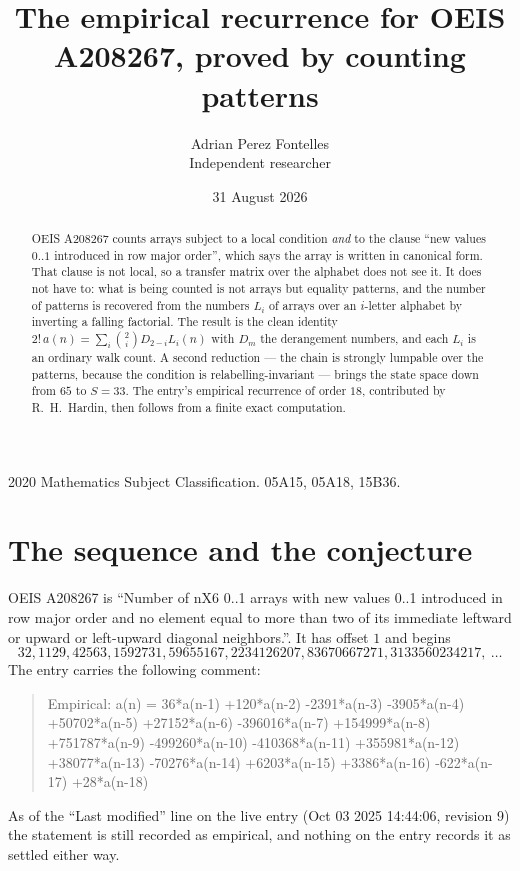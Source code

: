\documentclass[11pt,a4paper]{article}
\title{The empirical recurrence for OEIS A208267, proved by counting patterns}
\author{Adrian Perez Fontelles\\ \small Independent researcher}
\date{31 August 2026}
\theoremstyle{plain}
\theoremstyle{definition}
\begin{document}
\maketitle

\begin{abstract}
OEIS A208267 counts arrays subject to a local condition \emph{and} to the clause ``new values
$0..1$ introduced in row major order'', which says the array is written in canonical
form. That clause is not local, so a transfer matrix over the alphabet does not see it. It
does not have to: what is being counted is not arrays but equality patterns, and the number
of patterns is recovered from the numbers $L_i$ of arrays over an $i$-letter alphabet by
inverting a falling factorial. The result is the clean identity
$2!\,a(n)=\sum_i\binom{2}{i}D_{2-i}L_i(n)$ with $D_m$ the derangement numbers,
and each $L_i$ is an ordinary walk count. A second reduction --- the chain is strongly
lumpable over the patterns, because the condition is relabelling-invariant --- brings the
state space down from $65$ to $S=33$. The entry's empirical recurrence of order
$18$, contributed by R.~H.~Hardin, then follows from a finite exact computation.
\end{abstract}

\noindent\small 2020 Mathematics Subject Classification. 05A15, 05A18, 15B36.\normalsize

\section{The sequence and the conjecture}

OEIS A208267 is ``Number of nX6 0..1 arrays with new values 0..1 introduced in row major order and no element equal to more than two of its immediate leftward or upward or left-upward diagonal neighbors.''. It has offset $1$ and begins
\[
32, 1129, 42563, 1592731, 59655167, 2234126207, 83670667271, 3133560234217,\ \dots
\]
The entry carries the following comment:
\begin{quote}\small
Empirical: a(n) = 36*a(n-1) +120*a(n-2) -2391*a(n-3) -3905*a(n-4) +50702*a(n-5) +27152*a(n-6) -396016*a(n-7) +154999*a(n-8) +751787*a(n-9) -499260*a(n-10) -410368*a(n-11) +355981*a(n-12) +38077*a(n-13) -70276*a(n-14) +6203*a(n-15) +3386*a(n-16) -622*a(n-17) +28*a(n-18)
\end{quote}
As of the ``Last modified'' line on the live entry (Oct 03 2025 14:44:06, revision 9) the statement is
still recorded as empirical, and nothing on the entry records it as settled either way.
\end{document}
